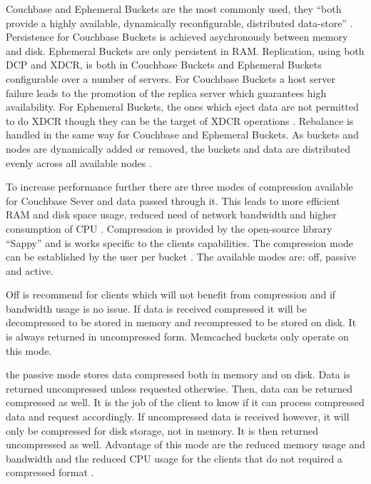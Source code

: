 Couchbase and Ephemeral Buckets are the most commonly used, they \enquote{both provide a highly available, dynamically reconfigurable, distributed data-store} \parencite{couchbaseDocuBuckets}. Persistence for Couchbase Buckets is achieved asychronously between memory and disk. Ephemeral Buckets are only persistent in RAM. Replication, using both DCP and XDCR, is both in Couchbase Buckets and Ephemeral Buckets configurable over a number of servers. For Couchbase Buckets a host server failure leads to the promotion of the replica server which guarantees high availability. For Ephemeral Buckets, the ones which eject data are not permitted to do XDCR though they can be the target of XDCR operations \parencite{couchbaseDocuBuckets}. Rebalance is handled in the same way for Couchbase and Ephemeral Buckets. As buckets and nodes are dynamically added or removed, the buckets and data are distributed evenly across all available nodes \parencite{couchbaseDocuBuckets}.

To increase performance further there are three modes of compression available for Couchbase Sever and data passed through it. This leads to more efficient RAM and disk space usage, reduced need of network bandwidth and higher consumption of CPU \parencite{couchbaseDocuCompression}. Compression is provided by the open-source library \enquote{Sappy} and is works specific to the clients capabilities. The compression mode can be established by the user per bucket \parencite{couchbaseDocuCompression}. The available modes are: off, passive and active.

Off is recommend for clients which will not benefit from compression and if bandwidth usage is no issue. If data is received compressed it will be decompressed to be stored in memory and recompressed to be stored on disk. It is always returned in uncompressed form. Memcached buckets only operate on this mode\parencite{couchbaseDocuCompression}.

the passive mode stores data compressed both in memory and on disk. Data is returned uncompressed unless requested otherwise. Then, data can be returned compressed as well. It is the job of the client to know if it can process compressed data and request accordingly. If uncompressed data is received however, it will only be compressed for disk storage, not in memory. It is then returned uncompressed as well. Advantage of this mode are the reduced memory usage and bandwidth and the reduced CPU usage for the clients that do not required a compressed format \parencite{couchbaseDocuCompression}.

